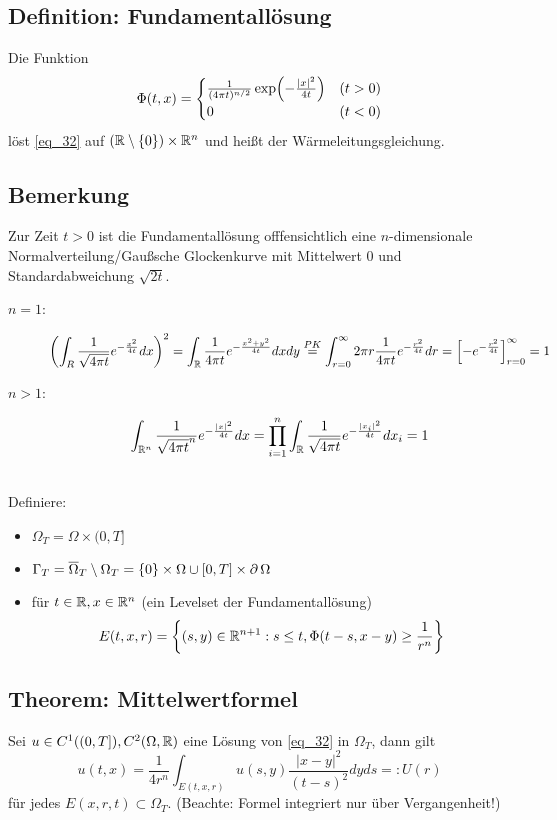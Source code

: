 \subsection{Definition: Fundamentallösung}
\label{def_83}
	Die Funktion \marginnote{[83]}
	\[ \Phi(t,x) = \begin{cases}
		\frac{1}{(4\pi t)^{n/2}} \exp \enbrace*{ - \frac{|x|^2}{4t}} & (t > 0) \\
		0 & (t < 0) \end{cases} \]
	löst \eqref{eq_32} auf $(\RR \setminus \setnull) \times \RR^n$ und heißt  der Wärmeleitungsgleichung.
	
\subsection{Bemerkung}
\label{bem_84}
	Zur Zeit $t > 0$ \marginnote{[84]} ist die Fundamentallösung offfensichtlich eine $n$-dimensionale Normalverteilung/Gaußsche Glockenkurve mit Mittelwert 0 und Standardabweichung $\sqrt{2t}$.
	
	\begin{description}
		\item[$n=1$:]
		\[ \enbrace*{ \int_R \frac{1}{\sqrt{4 \pi t}} e^{-\frac{x^2}{4t}} dx}^2 = \int_{\RR} \frac{1}{4\pi t} e^{-\frac{x^2+y^2}{4t}} dxdy \overset{PK}{=} \int_{r=0}^{\infty} 2\pi r \frac{1}{4\pi t} e^{-\frac{r^2}{4t}} dr = \left \lbrack -e^{- \frac{r^2}{4t}} \right\rbrack_{r=0}^\infty = 1 \]
		\item[$n > 1$:]
		\[ \int_{\RR^n} \frac{1}{\sqrt{4\pi t}^n} e^{- \frac{|x|^2}{4t}} dx = \prod\limits_{i=1}^{n} \int_{\RR} \frac{1}{\sqrt{4\pi t}} e^{-\frac{|x_i|^2}{4t}} dx_i = 1 \]
	\end{description}
	
\mbox{} \\
Definiere: \begin{itemize}
	\item $\Omega_T = \Omega \times (0,T]$ \\
	\item $\Gamma_T = \overline{\Omega}_T \setminus \Omega_T = \setnull \times \Omega \cup [0,T] \times \der \Omega$
	\item {} für $t \in \RR, x \in \RR^n$ (ein Levelset der Fundamentallösung)
	\[ E(t,x,r) = \penbrace*{(s,y) \in \RR^{n+1} : s \leq t, \Phi(t-s,x-y) \geq \frac{1}{r^n}} \]
\end{itemize}

\subsection{Theorem: Mittelwertformel}
\label{thm_85}
	Sei $u \in C^1((0,T]),C^2(\Omega,\RR)$ eine Lösung von \eqref{eq_32} in $\Omega_T$, dann gilt \marginnote{[85]}
	\begin{equation}
		u(t,x) = \frac{1}{4r^n} \int_{E(t,x,r)} u(s,y) \frac{|x-y|^2}{(t-s)^2} dyds =: U(r) \label{eq_33}
	\end{equation}
	für jedes $E(x,r,t) \subset \Omega_T$. (Beachte: Formel integriert nur über Vergangenheit!)
	
